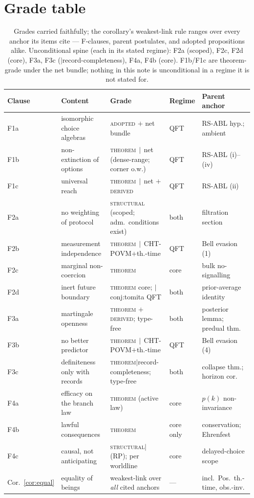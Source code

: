 \documentclass[11pt]{article}
\newcommand{\THM}{{\normalfont\scshape theorem}}                %
\newcommand{\THMC}[1]{{\normalfont\scshape theorem}$\,\mid\,${\normalfont\small #1}} %
\newcommand{\ADOPTED}{{\normalfont\scshape adopted}}            %
\newcommand{\STRUCT}{{\normalfont\scshape structural}}          %
\newcommand{\DERIVED}{{\normalfont\scshape derived}}            %
\begin{document}
\section{Grade table}\label{sec:grades}

\begin{table}[h]
\centering\scriptsize\setlength{\tabcolsep}{2.5pt}
\begin{tabular}{@{}lllll@{}}
\toprule
Clause & Content & Grade & Regime & Parent anchor \\
\midrule
F1a & isomorphic choice algebras & \ADOPTED{} $+$ net bundle & QFT & RS-ABL hyp.; ambient \\
F1b & non-extinction of options & \THMC{net} (dense-range; corner o.w.) & QFT & RS-ABL (i)--(iv) \\
F1c & universal reach & \THMC{net} $+$ \DERIVED{} & QFT & RS-ABL (ii) \\
F2a & no weighting of protocol & \STRUCT{} (scoped; adm.\ conditions exist) & both & filtration section \\
F2b & measurement independence & \THMC{\textsf{CHT-POVM}$+$th.-time} & QFT & Bell evasion (1) \\
F2c & marginal non-coercion & \THM{} & core & bulk no-signalling \\
F2d & inert future boundary & \THM{} core; $\mid$\textsf{conj:tomita} QFT & both & prior-average identity \\
F3a & martingale openness & \THM{} $+$ \DERIVED{}; type-free & both & posterior lemma; predual thm. \\
F3b & no better predictor & \THMC{\textsf{CHT-POVM}$+$th.-time} & QFT & Bell evasion (4) \\
F3c & definiteness only with records & \THM{}$\mid$record-completeness; type-free & both & collapse thm.; horizon cor. \\
F4a & efficacy on the branch law & \THM{} (active law) & core & $p(k)$ non-invariance \\
F4b & lawful consequences & \THM{} & core only & conservation; Ehrenfest \\
F4c & causal, not anticipating & \STRUCT{}$\mid$(RP); per worldline & core & delayed-choice scope \\
Cor.~\ref{cor:equal} & equality of beings & weakest-link over \emph{all} cited anchors & --- & incl.\ Pos.\ th.-time, obs.-inv. \\
\bottomrule
\end{tabular}
\caption{Grades carried faithfully; the corollary's weakest-link rule ranges
over every anchor its items cite --- F-clauses, parent postulates, and adopted
propositions alike. Unconditional spine (each in its stated regime): F2a
(scoped), F2c, F2d (core), F3a, F3c ($\mid$record-completeness), F4a, F4b
(core). F1b/F1c are theorem-grade under the net bundle; nothing in this note is
unconditional in a regime it is not stated for.}
\label{tab:grades}
\end{table}
\end{document}
